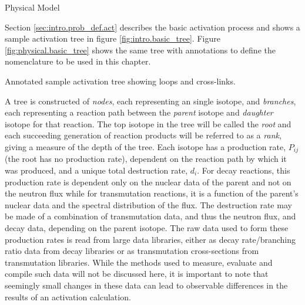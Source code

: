 \begin{chapter}{Physical Model\label{chap:physical}}

Section \ref{sec:intro.prob_def.act} describes the basic activation
process and shows a sample activation tree in figure
\ref{fig:intro.basic_tree}.  Figure \ref{fig:physical.basic_tree} shows
the same tree with annotations to define the nomenclature to be used
in this chapter.

\begin{floatingfigure}{0.55\columnwidth}
  \begin{center}
    \caption{Annotated sample activation tree showing loops and
      cross-links.}\label{fig:physical.basic_tree}
  \end{center}
\end{floatingfigure}

A tree is constructed of \textsl{nodes}, each representing an single
isotope, and \textsl{branches}, each representing a reaction path
between the \textsl{parent} isotope and \textsl{daughter} isotope for
that reaction.  The top isotope in the tree will be called the
\textsl{root} and each succeeding generation of reaction products will
be referred to as a \textsl{rank}, giving a measure of the depth of
the tree.  Each isotope has a production rate, $P_{ij}$ (the root has
no production rate), dependent on the reaction path by which it was
produced, and a unique total destruction rate, $d_i$.  For decay
reactions, this production rate is dependent only on the nuclear data
of the parent and not on the neutron flux while for transmutation
reactions, it is a function of the parent's nuclear data and the
spectral distribution of the flux.  The destruction rate may be made
of a combination of transmutation data, and thus the neutron flux, and
decay data, depending on the parent isotope.  The raw data used to
form these production rates is read from large data libraries, either
as decay rate/branching ratio data from decay libraries or as
transmutation cross-sections from transmutation libraries.  While the
methods used to measure, evaluate and compile such data will not be
discussed here, it is important to note that seemingly small changes
in these data can lead to observable differences in the results of an
activation calculation.


\end{chapter}
